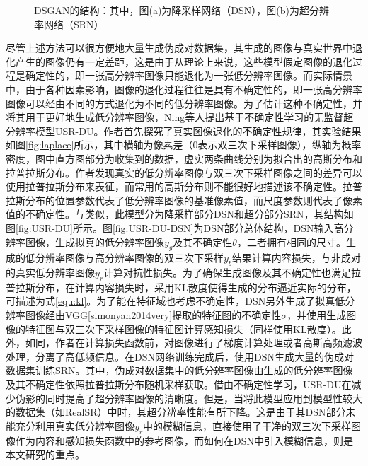 \begin{figure}[htbp]
    \hfill
    \caption{DSGAN的结构：其中，图(a)为降采样网络（DSN），图(b)为超分辨率网络（SRN）}	
    \label{fig:DSGAN}
\end{figure}

尽管上述方法可以很方便地大量生成伪成对数据集，其生成的图像与真实世界中退化产生的图像仍有一定差距，这是由于从理论上来说，这些模型假定图像的退化过程是确定性的，即一张高分辨率图像只能退化为一张低分辨率图像。而实际情景中，由于各种因素影响，图像的退化过程往往是具有不确定性的，即一张高分辨率图像可以经由不同的方式退化为不同的低分辨率图像。为了估计这种不确定性，并将其用于更好地生成低分辨率图像，Ning等人\parencite{ijcai2022p176}提出基于不确定性学习的无监督超分辨率模型USR-DU。作者首先探究了真实图像退化的不确定性规律，其实验结果如图\ref{fig:laplace}所示，其中横轴为像素差（0表示双三次下采样图像），纵轴为概率密度，图中直方图部分为收集到的数据，虚实两条曲线分别为拟合出的高斯分布和拉普拉斯分布。作者发现真实的低分辨率图像与双三次下采样图像之间的差异可以使用拉普拉斯分布来表征，而常用的高斯分布则不能很好地描述该不确定性。拉普拉斯分布的位置参数代表了低分辨率图像的基准像素值，而尺度参数则代表了像素值的不确定性。与\parencite{fritsche2019frequency}类似，此模型分为降采样部分DSN和超分部分SRN，其结构如图\ref{fig:USR-DU}所示。图\ref{fig:USR-DU-DSN}为DSN部分总体结构，DSN输入高分辨率图像，生成拟真的低分辨率图像$y_g$及其不确定性$\theta$，二者拥有相同的尺寸。生成的低分辨率图像与高分辨率图像的双三次下采样$y_b$结果计算内容损失，与非成对的真实低分辨率图像$y_r$计算对抗性损失。为了确保生成图像及其不确定性也满足拉普拉斯分布，在计算内容损失时，采用KL散度使得生成的分布逼近实际的分布，可描述为式\ref{equ:kl}。为了能在特征域也考虑不确定性，DSN另外生成了拟真低分辨率图像经由VGG\ref{simonyan2014very}提取的特征图的不确定性$\sigma$，并使用生成图像的特征图与双三次下采样图像的特征图计算感知损失（同样使用KL散度）。此外，如同\parencite{fritsche2019frequency}，作者在计算损失函数前，对图像进行了梯度计算处理或者高斯高频滤波处理，分离了高低频信息。在DSN网络训练完成后，使用DSN生成大量的伪成对数据集训练SRN。其中，伪成对数据集中的低分辨率图像由生成的低分辨率图像及其不确定性依照拉普拉斯分布随机采样获取。借由不确定性学习，USR-DU在减少伪影的同时提高了超分辨率图像的清晰度。但是，当将此模型应用到模型性较大的数据集（如RealSR）中时，其超分辨率性能有所下降。这是由于其DSN部分未能充分利用真实低分辨率图像$y_r$中的模糊信息，直接使用了干净的双三次下采样图像作为内容和感知损失函数中的参考图像，而如何在DSN中引入模糊信息，则是本文研究的重点。

